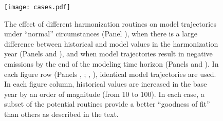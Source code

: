\begin{figure}
  \begin{center}
    \texttt{[image: cases.pdf]}
    \caption[]{
      \label{fig:cases}
      The effect of different harmonization routines on model trajectories under
      ``normal'' circumstances (Panel ), when there is a large
      difference between historical and model values in the harmonization year
      (Panels  and ), and when model trajectories result in
      negative emissions by the end of the modeling time horizon (Panels
       and ). In each figure row (Panels , ;
      , ), identical model trajectories are used. In each figure
      column, historical values are increased in the base year by an order of
      magnitude (from 10 to 100). In each case, a subset of the potential
      routines provide a better ``goodness of fit'' than others as described in
      the text.  }
  \end{center}
\end{figure}

